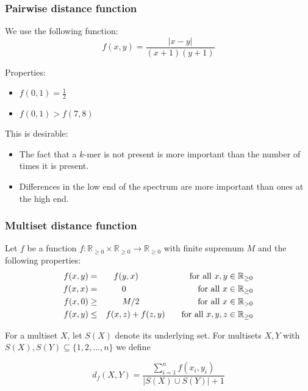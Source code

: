 \documentclass[slidestop]{beamer}
\begin{document}
\begin{frame}
  \frametitle{Pairwise distance function}

  We use the following function:
  \begin{displaymath}
    f(x, y) = \frac{|x - y|}{(x + 1) (y + 1)}
  \end{displaymath}
  \pause

  Properties:
  \begin{itemize}
    \item $f(0, 1) = \frac12$
    \item $f(0, 1) > f(7, 8)$
  \end{itemize}
  \bigskip
  \bigskip
  \pause

  This is desirable:
  \begin{itemize}
    \item The fact that a $k$-mer is not present is more important than the
      number of times it is present.
    \item Differences in the low end of the spectrum are more important than
      ones at the high end.
  \end{itemize}
\end{frame}

\begin{frame}
  \frametitle{Multiset distance function}

  Let $f$ be a function $f : \mathbb{R}_{\ge 0} \times \mathbb{R}_{\ge 0} 
                               \to \mathbb{R}_{\ge 0}$
  with finite supremum $M$ and the following properties:
  \begin{eqnarray*}
    f(x, y) &=& f(y, x) \hspace*{2cm}\mathrm{\ for\ all\ } x, y \in
      \mathbb{R}_{\ge 0}\\
    f(x, x) &=& 0 \hspace*{2.85cm}\mathrm{\ for\ all\ } x \in \mathbb{R}_{\ge
      0}\\
    f(x, 0) &\ge& {M}/2 \hspace*{2.3cm}\mathrm{\ for\ all\ } x \in
      \mathbb{R}_{> 0}\\
    f(x, y) &\le& f(x, z) + f(z, y) \hspace*{0.56cm}\mathrm{\ for\ all\ } x, y,
      z \in \mathbb{R}_{\ge 0}
  \end{eqnarray*}
  \smallskip
  \pause

  For a multiset $X$, let $S(X)$ denote its underlying set. For multisets $X,
  Y$ with $S(X),S(Y) \subseteq \{1, 2, \ldots, n\}$ we define 
  \smallskip

  \begin{displaymath}
    d_f(X, Y) = \frac{\sum_{i = 1}^n f(x_i, y_i)}{|S(X) \cup S(Y)| + 1}
  \end{displaymath}
  \bigskip
\end{frame}
\end{document}
